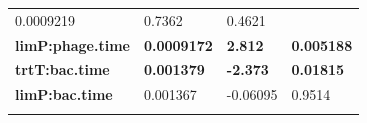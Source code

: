 \documentclass[]{article}
\begin{document}
\begin{longtable}[]{@{}llll@{}}
\begin{minipage}[t]{0.17\columnwidth}
0.0009219
\strut\end{minipage} &
\begin{minipage}[t]{0.13\columnwidth}\raggedright\strut
0.7362
\strut\end{minipage} &
\begin{minipage}[t]{0.16\columnwidth}\raggedright\strut
0.4621
\strut\end{minipage}\tabularnewline
\begin{minipage}[t]{0.43\columnwidth}\raggedright\strut
\textbf{limP:phage.time}
\strut\end{minipage} &
\begin{minipage}[t]{0.17\columnwidth}\raggedright\strut
\textbf{0.0009172}
\strut\end{minipage} &
\begin{minipage}[t]{0.13\columnwidth}\raggedright\strut
\textbf{2.812}
\strut\end{minipage} &
\begin{minipage}[t]{0.16\columnwidth}\raggedright\strut
\textbf{0.005188}
\strut\end{minipage}\tabularnewline
\begin{minipage}[t]{0.43\columnwidth}\raggedright\strut
\textbf{trtT:bac.time}
\strut\end{minipage} &
\begin{minipage}[t]{0.17\columnwidth}\raggedright\strut
\textbf{0.001379}
\strut\end{minipage} &
\begin{minipage}[t]{0.13\columnwidth}\raggedright\strut
\textbf{-2.373}
\strut\end{minipage} &
\begin{minipage}[t]{0.16\columnwidth}\raggedright\strut
\textbf{0.01815}
\strut\end{minipage}\tabularnewline
\begin{minipage}[t]{0.43\columnwidth}\raggedright\strut
\textbf{limP:bac.time}
\strut\end{minipage} &
\begin{minipage}[t]{0.17\columnwidth}\raggedright\strut
0.001367
\strut\end{minipage} &
\begin{minipage}[t]{0.13\columnwidth}\raggedright\strut
-0.06095
\strut\end{minipage} &
\begin{minipage}[t]{0.16\columnwidth}\raggedright\strut
0.9514
\strut\end{minipage}\tabularnewline
\begin{minipage}[t]{0.43\columnwidth}\raggedright\strut

\end{minipage}
\end{longtable}
\end{document}
